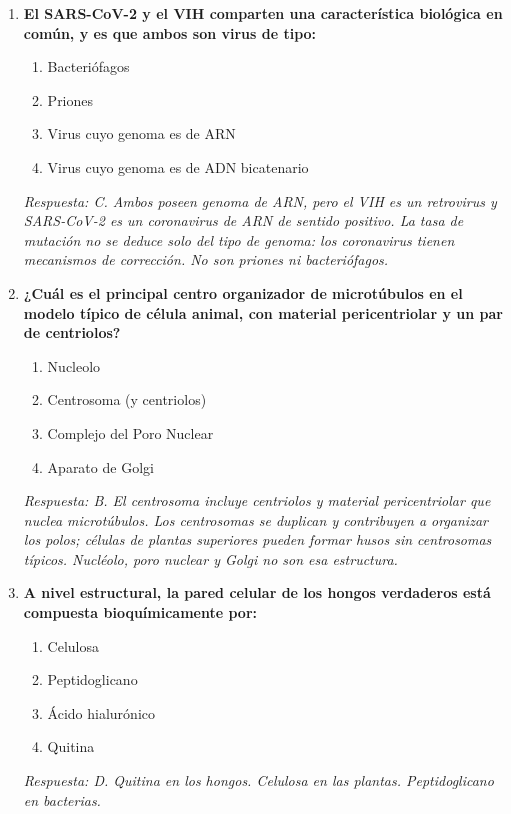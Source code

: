 \begin{enumerate}[label=\textbf{\arabic*.}]
    \item \textbf{El SARS-CoV-2 y el VIH comparten una característica biológica en común, y es que ambos son virus de tipo:}
    \begin{enumerate}
        \item[A)] Bacteriófagos
        \item[B)] Priones
        \item[C)] Virus cuyo genoma es de ARN
        \item[D)] Virus cuyo genoma es de ADN bicatenario
    \end{enumerate}
    \textit{Respuesta: C. Ambos poseen genoma de ARN, pero el VIH es un retrovirus y SARS-CoV-2 es un coronavirus de ARN de sentido positivo. La tasa de mutación no se deduce solo del tipo de genoma: los coronavirus tienen mecanismos de corrección. No son priones ni bacteriófagos.}

    \item \textbf{¿Cuál es el principal centro organizador de microtúbulos en el modelo típico de célula animal, con material pericentriolar y un par de centriolos?}
    \begin{enumerate}
        \item[A)] Nucleolo
        \item[B)] Centrosoma (y centriolos)
        \item[C)] Complejo del Poro Nuclear
        \item[D)] Aparato de Golgi
    \end{enumerate}
    \textit{Respuesta: B. El centrosoma incluye centriolos y material pericentriolar que nuclea microtúbulos. Los centrosomas se duplican y contribuyen a organizar los polos; células de plantas superiores pueden formar husos sin centrosomas típicos. Nucléolo, poro nuclear y Golgi no son esa estructura.}

    \item \textbf{A nivel estructural, la pared celular de los hongos verdaderos está compuesta bioquímicamente por:}
    \begin{enumerate}
        \item[A)] Celulosa
        \item[B)] Peptidoglicano
        \item[C)] Ácido hialurónico
        \item[D)] Quitina
    \end{enumerate}
    \textit{Respuesta: D. Quitina en los hongos. Celulosa en las plantas. Peptidoglicano en bacterias.}


\end{enumerate}
